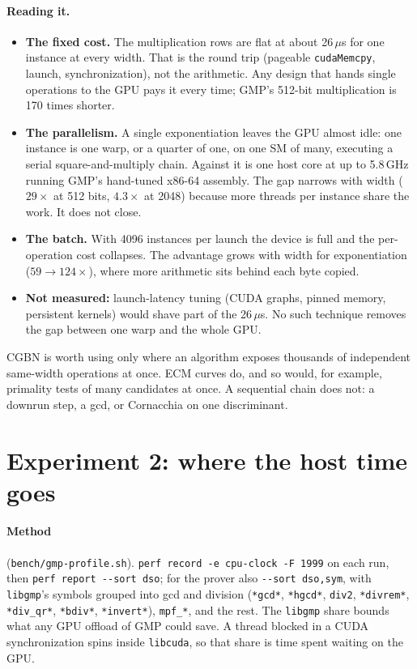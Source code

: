 \documentclass[11pt,a4paper]{article}
\newcommand{\code}[1]{\texttt{#1}}
\newcommand{\us}{\,$\mu$s}
\begin{document}
\paragraph{Reading it.}
\begin{itemize}
  \item \textbf{The fixed cost.} The multiplication rows are flat at about
    26\us{} for one instance at every width. That is the round trip
    (pageable \code{cudaMemcpy}, launch, synchronization), not the
    arithmetic. Any design that hands single operations to the GPU pays it
    every time; GMP's 512-bit multiplication is 170 times shorter.
  \item \textbf{The parallelism.} A single exponentiation leaves the GPU
    almost idle: one instance is one warp, or a quarter of one, on one SM
    of many, executing a serial square-and-multiply chain. Against it is
    one host core at up to 5.8\,GHz running GMP's hand-tuned x86-64
    assembly. The gap narrows with width ($29\times$ at 512 bits,
    $4.3\times$ at 2048) because more threads per instance share the work.
    It does not close.
  \item \textbf{The batch.} With 4096 instances per launch the device is
    full and the per-operation cost collapses. The advantage grows with
    width for exponentiation ($59 \to 124\times$), where more arithmetic
    sits behind each byte copied.
  \item \textbf{Not measured:} launch-latency tuning (CUDA graphs, pinned
    memory, persistent kernels) would shave part of the 26\us. No such
    technique removes the gap between one warp and the whole GPU.
\end{itemize}
CGBN is worth using only where an algorithm exposes thousands of
independent same-width operations at once. ECM curves do, and so would,
for example, primality tests of many candidates at once. A sequential
chain does not: a downrun step, a gcd, or Cornacchia on one discriminant.

\section{Experiment 2: where the host time goes}
\label{sec:exp2}

\paragraph{Method} (\code{bench/gmp-profile.sh}). \code{perf record -e
cpu-clock -F 1999} on each run, then \code{perf report -{}-sort dso}; for
the prover also \code{-{}-sort dso,sym}, with \code{libgmp}'s symbols grouped
into gcd and division (\code{*gcd*}, \code{*hgcd*}, \code{div2},
\code{*divrem*}, \code{*div\_qr*}, \code{*bdiv*}, \code{*invert*}),
\code{mpf\_*}, and the rest. The \code{libgmp} share bounds what any GPU
offload of GMP could save. A thread blocked in a CUDA synchronization
spins inside \code{libcuda}, so that share is time spent waiting on the
GPU.
\end{document}
